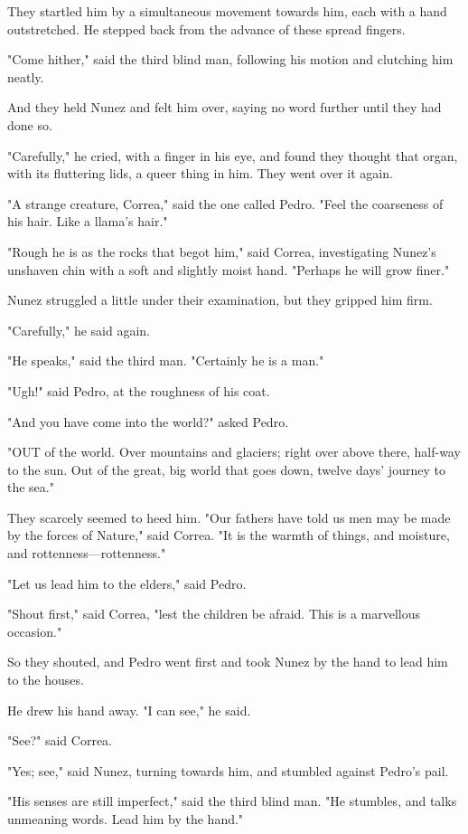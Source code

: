 \documentclass[courier]{sffms}
\begin{document}
They startled him by a simultaneous movement towards him, each with a
hand outstretched. He stepped back from the advance of these spread
fingers.

"Come hither," said the third blind man, following his motion and
clutching him neatly.

And they held Nunez and felt him over, saying no word further until
they had done so.

"Carefully," he cried, with a finger in his eye, and found they
thought that organ, with its fluttering lids, a queer thing in
him. They went over it again.

"A strange creature, Correa," said the one called Pedro. "Feel the
coarseness of his hair. Like a llama's hair."

"Rough he is as the rocks that begot him," said Correa, investigating
Nunez's unshaven chin with a soft and slightly moist hand. "Perhaps he
will grow finer."

Nunez struggled a little under their examination, but they gripped him
firm.

"Carefully," he said again.

"He speaks," said the third man. "Certainly he is a man."

"Ugh!" said Pedro, at the roughness of his coat.

"And you have come into the world?" asked Pedro.

"OUT of the world. Over mountains and glaciers; right over above
there, half-way to the sun. Out of the great, big world that goes
down, twelve days' journey to the sea."

They scarcely seemed to heed him. "Our fathers have told us men may be
made by the forces of Nature," said Correa. "It is the warmth of
things, and moisture, and rottenness---rottenness."

"Let us lead him to the elders," said Pedro.

"Shout first," said Correa, "lest the children be afraid. This is a
marvellous occasion."

So they shouted, and Pedro went first and took Nunez by the hand to
lead him to the houses.

He drew his hand away. "I can see," he said.

"See?" said Correa.

"Yes; see," said Nunez, turning towards him, and stumbled against
Pedro's pail.

"His senses are still imperfect," said the third blind man. "He
stumbles, and talks unmeaning words. Lead him by the hand."
\end{document}
